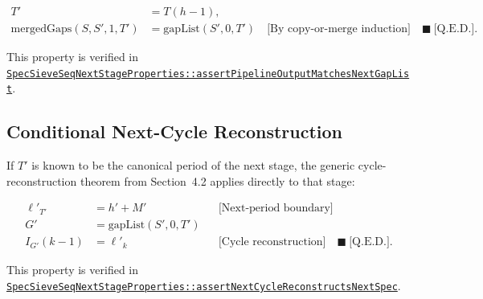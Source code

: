 \begin{equation*}
\begin{aligned}
T'&=T(h-1), \\
\text{mergedGaps}(S,S',1,T')
&=\text{gapList}(S',0,T')
  \quad\text{[By copy-or-merge induction]}\quad\blacksquare\ \text{[Q.E.D.]}.
\end{aligned}
\end{equation*}

{\raggedright
This property is verified in
\href{https://github.com/thiagomata/prime-numbers/blob/master/src/main/scala/v1/chapter6/sieve/seq/spec/properties/SpecSieveSeqNextStageProperties.scala}{\texttt{SpecSieveSeqNextStageProperties::assertPipelineOutputMatchesNextGapList}}.
\par}

\subsection{Conditional Next-Cycle Reconstruction}
\label{sec:conditional-next-cycle-reconstruction}

If $T'$ is known to be the canonical period of the next stage, the
generic cycle-reconstruction theorem from Section~4.2 applies directly to
that stage:

\begin{equation*}
\begin{aligned}
\ell'_{T'} &= h'+M'
  &&\text{[Next-period boundary]} \\
G'&=\text{gapList}(S',0,T') \\
I_{G'}(k-1)&=\ell'_k
  &&\text{[Cycle reconstruction]}\quad\blacksquare\ \text{[Q.E.D.]}.
\end{aligned}
\end{equation*}

{\raggedright
This property is verified in
\href{https://github.com/thiagomata/prime-numbers/blob/master/src/main/scala/v1/chapter6/sieve/seq/spec/properties/SpecSieveSeqNextStageProperties.scala}{\texttt{SpecSieveSeqNextStageProperties::assertNextCycleReconstructsNextSpec}}.
\par}
